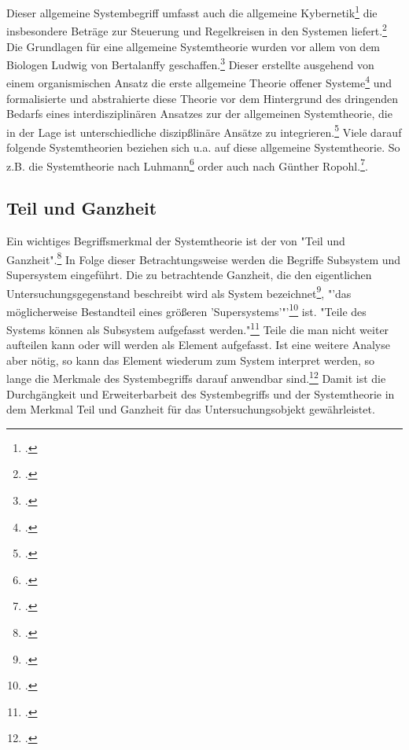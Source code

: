 \documentclass[a4paper,12pt]{article}
\begin{document}
Dieser allgemeine Systembegriff umfasst auch die allgemeine Kybernetik\footcite[S. 102]{Ulrich1968} die insbesondere Beträge zur Steuerung und Regelkreisen in den Systemen liefert.\footcite[S. 50]{Ulrich2016} Die Grundlagen für eine allgemeine Systemtheorie wurden vor allem von dem Biologen Ludwig von Bertalanffy geschaffen.\footcite[S. 102]{Ulrich1968} Dieser erstellte ausgehend von einem organismischen Ansatz die erste allgemeine Theorie offener Systeme\footcite[S. 70]{Diesner2015} und formalisierte und abstrahierte diese Theorie vor dem Hintergrund des dringenden Bedarfs eines interdisziplinären Ansatzes zur der allgemeinen Systemtheorie, die in der Lage ist unterschiedliche diszipßlinäre Ansätze zu integrieren.\footcite[S. 71]{Diesner2015} Viele darauf folgende Systemtheorien beziehen sich u.a. auf diese allgemeine Systemtheorie. So z.B. die Systemtheorie nach Luhmann\footcite[S. 15]{Luhmann1999} order auch nach Günther Ropohl.\footcite[S. 70]{Ropohl2009}.

\subsection{Teil und Ganzheit}\label{teilganzheit}
Ein wichtiges Begriffsmerkmal der Systemtheorie ist der von "Teil und Ganzheit".\footcite[S. 107]{Ulrich1968} In Folge dieser Betrachtungsweise werden die Begriffe Subsystem und Supersystem eingeführt. Die zu betrachtende Ganzheit, die den eigentlichen Untersuchungsgegenstand beschreibt wird als System bezeichnet\footcite[S. 107]{Ulrich1968}, "'das möglicherweise Bestandteil eines größeren 'Supersystems'"'\footcite[107]{Ulrich1968} ist. "Teile des Systems können als Subsystem aufgefasst werden."\footcite[S. 107]{Ulrich1968} Teile die man nicht weiter aufteilen kann oder will werden als Element aufgefasst. Ist eine weitere Analyse aber nötig, so kann das Element wiederum zum System interpret werden, so lange die Merkmale des Systembegriffs darauf anwendbar sind.\footcite[S. 107]{Ulrich1968} Damit ist die Durchgängkeit und Erweiterbarbeit des Systembegriffs und der Systemtheorie in dem Merkmal Teil und Ganzheit für das Untersuchungsobjekt gewährleistet. 
\end{document}

